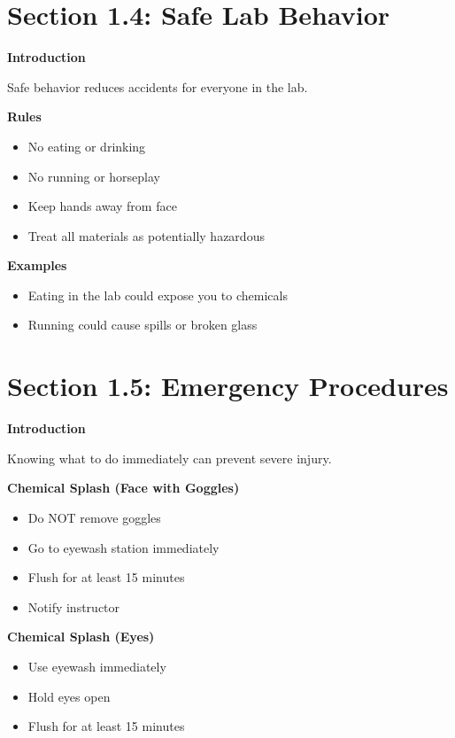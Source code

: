 \documentclass[
  letterpaper,
  DIV=11,
  numbers=noendperiod]{scrreprt}
\begin{document}
\section{\texorpdfstring{\textbf{Section 1.4: Safe Lab
Behavior}}{Section 1.4: Safe Lab Behavior}}\label{section-1.4-safe-lab-behavior}

\textbf{Introduction}

Safe behavior reduces accidents for everyone in the lab.

\textbf{Rules}

\begin{itemize}
\item
  No eating or drinking
\item
  No running or horseplay
\item
  Keep hands away from face
\item
  Treat all materials as potentially hazardous
\end{itemize}

\textbf{Examples}

\begin{itemize}
\item
  Eating in the lab could expose you to chemicals
\item
  Running could cause spills or broken glass
\end{itemize}

\section{\texorpdfstring{\textbf{Section 1.5: Emergency
Procedures}}{Section 1.5: Emergency Procedures}}\label{section-1.5-emergency-procedures}

\textbf{Introduction}

Knowing what to do immediately can prevent severe injury.

\textbf{Chemical Splash (Face with Goggles)}

\begin{itemize}
\item
  Do NOT remove goggles
\item
  Go to eyewash station immediately
\item
  Flush for at least 15 minutes
\item
  Notify instructor
\end{itemize}

\textbf{Chemical Splash (Eyes)}

\begin{itemize}
\item
  Use eyewash immediately
\item
  Hold eyes open
\item
  Flush for at least 15 minutes
\end{itemize}
\end{document}
